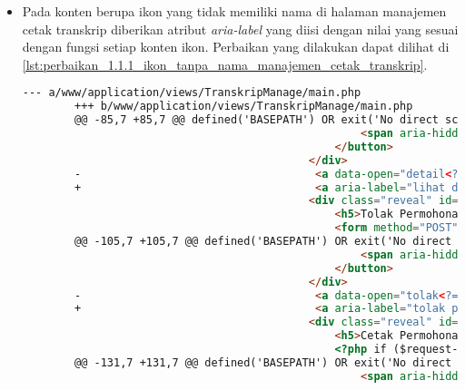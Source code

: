 \begin{itemize}
    \item Pada konten berupa ikon yang tidak memiliki nama di halaman manajemen cetak transkrip diberikan atribut \textit{aria-label} yang diisi dengan nilai yang sesuai dengan fungsi setiap konten ikon. Perbaikan yang dilakukan dapat dilihat di \ref{lst:perbaikan_1.1.1_ikon_tanpa_nama_manajemen_cetak_transkrip}.
    \begin{lstlisting}[frame=single, label={lst:perbaikan_1.1.1_ikon_tanpa_nama_manajemen_cetak_transkrip}, language=HTML, caption=Perbaikan Kriteria Sukses 1.1.1 - Ikon Tanpa Nama di Halaman Manajemen Cetak Transkrip]
        --- a/www/application/views/TranskripManage/main.php
        +++ b/www/application/views/TranskripManage/main.php
        @@ -85,7 +85,7 @@ defined('BASEPATH') OR exit('No direct script access allowed');
                                                    <span aria-hidden="true">&times;</span>
                                                </button>                                        
                                            </div>
        -                                    <a data-open="detail<?= $request->id ?>"><i class="fi-eye"></i></a>
        +                                    <a aria-label="lihat detail permohonan" data-open="detail<?= $request->id ?>"><i class="fi-eye"></i></a>
                                            <div class="reveal" id="tolak<?= $request->id ?>" data-reveal>
                                                <h5>Tolak Permohonan</h5>
                                                <form method="POST" action="/TranskripManage/answer">
        @@ -105,7 +105,7 @@ defined('BASEPATH') OR exit('No direct script access allowed');
                                                    <span aria-hidden="true">&times;</span>
                                                </button>
                                            </div>
        -                                    <a data-open="tolak<?= $request->id ?>"><i class="fi-dislike"></i></a>
        +                                    <a aria-label="tolak permohonan" data-open="tolak<?= $request->id ?>"><i class="fi-dislike"></i></a>
                                            <div class="reveal" id="cetak<?= $request->id ?>" data-reveal>
                                                <h5>Cetak Permohonan</h5>
                                                <?php if ($request->requestByNPM !== NULL): ?>
        @@ -131,7 +131,7 @@ defined('BASEPATH') OR exit('No direct script access allowed');
                                                    <span aria-hidden="true">&times;</span>

\end{lstlisting}
\end{itemize}

